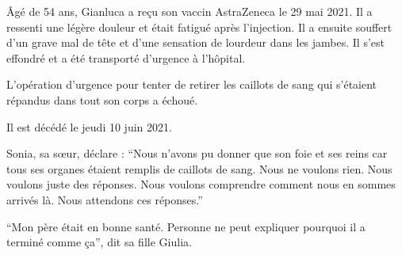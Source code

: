 Âgé de 54 ans, Gianluca a reçu son vaccin AstraZeneca le 29 mai 2021. Il a
ressenti une légère douleur et était fatigué après l'injection. Il a ensuite
souffert d'un grave mal de tête et d'une sensation de lourdeur dans les
jambes. Il s'est effondré et a été transporté d'urgence à l'hôpital.

L'opération d'urgence pour tenter de retirer les caillots de sang qui s'étaient
répandus dans tout son corps a échoué.

Il est décédé le jeudi 10 juin 2021.

Sonia, sa sœur, déclare : “Nous n'avons pu donner que son foie et ses reins car
tous ses organes étaient remplis de caillots de sang. Nous ne voulons rien. Nous
voulons juste des réponses. Nous voulons comprendre comment nous en sommes
arrivés là. Nous attendons ces réponses.”

“Mon père était en bonne santé. Personne ne peut expliquer pourquoi il a terminé
comme ça”, dit sa fille Giulia.


